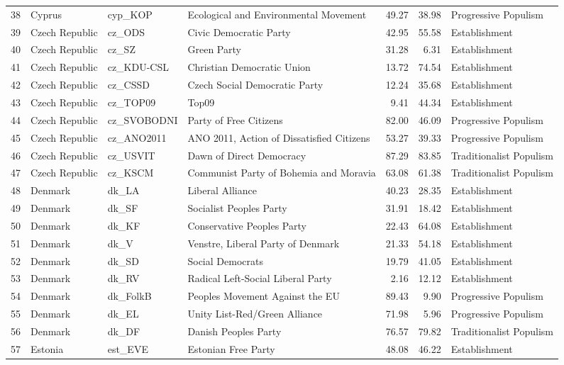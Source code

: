 \begin{landscape}
\begin{longtable}[c]{@{\extracolsep{\fill}}rlllrrl}
  38 & Cyprus & cyp\_KOP & Ecological and Environmental Movement & 49.27 & 38.98 & Progressive Populism \\ 
  39 & Czech Republic & cz\_ODS & Civic Democratic Party & 42.95 & 55.58 & Establishment \\ 
  40 & Czech Republic & cz\_SZ & Green Party & 31.28 & 6.31 & Establishment \\ 
  41 & Czech Republic & cz\_KDU-CSL & Christian Democratic Union & 13.72 & 74.54 & Establishment \\ 
  42 & Czech Republic & cz\_CSSD & Czech Social Democratic Party & 12.24 & 35.68 & Establishment \\ 
  43 & Czech Republic & cz\_TOP09 & Top09 & 9.41 & 44.34 & Establishment \\ 
  44 & Czech Republic & cz\_SVOBODNI & Party of Free Citizens & 82.00 & 46.09 & Progressive Populism \\ 
  45 & Czech Republic & cz\_ANO2011 & ANO 2011, Action of Dissatisfied Citizens & 53.27 & 39.33 & Progressive Populism \\ 
  46 & Czech Republic & cz\_USVIT & Dawn of Direct Democracy & 87.29 & 83.85 & Traditionalist Populism \\ 
  47 & Czech Republic & cz\_KSCM & Communist Party of Bohemia and Moravia & 63.08 & 61.38 & Traditionalist Populism \\ 
  48 & Denmark & dk\_LA & Liberal Alliance & 40.23 & 28.35 & Establishment \\ 
  49 & Denmark & dk\_SF & Socialist Peoples Party & 31.91 & 18.42 & Establishment \\ 
  50 & Denmark & dk\_KF & Conservative Peoples Party & 22.43 & 64.08 & Establishment \\ 
  51 & Denmark & dk\_V & Venstre, Liberal Party of Denmark & 21.33 & 54.18 & Establishment \\ 
  52 & Denmark & dk\_SD & Social Democrats & 19.79 & 41.05 & Establishment \\ 
  53 & Denmark & dk\_RV & Radical Left-Social Liberal Party & 2.16 & 12.12 & Establishment \\ 
  54 & Denmark & dk\_FolkB & Peoples Movement Against the EU & 89.43 & 9.90 & Progressive Populism \\ 
  55 & Denmark & dk\_EL & Unity List-Red/Green Alliance & 71.98 & 5.96 & Progressive Populism \\ 
  56 & Denmark & dk\_DF & Danish Peoples Party & 76.57 & 79.82 & Traditionalist Populism \\ 
  57 & Estonia & est\_EVE & Estonian Free Party & 48.08 & 46.22 & Establishment \\ 

\end{longtable}
\end{landscape}
